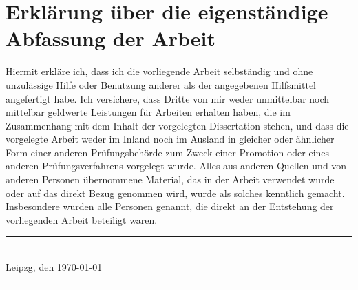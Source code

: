 \clearpage
\thispagestyle{empty}

\section*{Erklärung über die eigenständige Abfassung der Arbeit}

Hiermit erkläre ich, dass ich die vorliegende Arbeit selbständig und ohne unzulässige Hilfe
oder Benutzung anderer als der angegebenen Hilfsmittel angefertigt habe. Ich versichere,
dass Dritte von mir weder unmittelbar noch mittelbar geldwerte Leistungen für Arbeiten
erhalten haben, die im Zusammenhang mit dem Inhalt der vorgelegten Dissertation stehen,
und dass die vorgelegte Arbeit weder im Inland noch im Ausland in gleicher oder ähnlicher
Form einer anderen Prüfungsbehörde zum Zweck einer Promotion oder eines anderen
Prüfungsverfahrens vorgelegt wurde. Alles aus anderen Quellen und von anderen
Personen übernommene Material, das in der Arbeit verwendet wurde oder auf das direkt
Bezug genommen wird, wurde als solches kenntlich gemacht. Insbesondere wurden alle
Personen genannt, die direkt an der Entstehung der vorliegenden Arbeit beteiligt waren.

\vspace{4\baselineskip}

\begin{center}
\begin{minipage}[t]{0.48\textwidth}
\rule{12em}{0.5pt} \\
Leipzg, den \today
\end{minipage} %
\begin{minipage}[t]{0.48\textwidth}
\rule{12em}{0.5pt} \\
\ThesisAuthor
\end{minipage}
\end{center}

